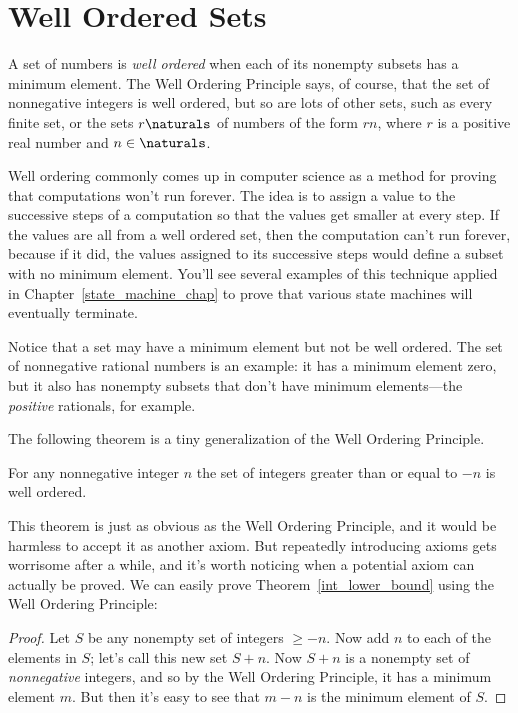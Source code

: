 \section{Well Ordered Sets}\label{well_ordering_sec}

A set of numbers is \emph{well ordered}%
when each of its nonempty subsets has a minimum element.  The Well
Ordering Principle says, of course, that the set of nonnegative
integers is well ordered, but so are lots of other sets, such as every
finite set, or the sets $r\naturals$ of numbers of the form $rn$,
where $r$ is a positive real number and $n \in \naturals$.

Well ordering commonly comes up in computer science as a method for
proving that computations won't run forever.  The idea is to assign a
value to the successive steps of a computation so that the values get
smaller at every step.  If the values are all from a well ordered set,
then the computation can't run forever, because if it did, the values
assigned to its successive steps would define a subset with no minimum
element.  You'll see several examples of this technique applied in
Chapter~\ref{state_machine_chap} to prove that various state machines%
will eventually terminate.

Notice that a set may have a minimum element but not be well ordered.
The set of nonnegative rational numbers is an example: it has a
minimum element zero, but it also has nonempty subsets that
don't have minimum elements---the \emph{positive} rationals, for
example.

The following theorem is a tiny generalization of the Well Ordering
Principle.

\begin{theorem}\label{int_lower_bound}
For any nonnegative integer $n$ the set of integers greater than or
equal to $-n$ is well ordered.
\end{theorem}

This theorem is just as obvious as the Well Ordering Principle, and it
would be harmless to accept it as another axiom.  But repeatedly
introducing axioms gets worrisome after a while, and it's worth
noticing when a potential axiom can actually be proved.  We can easily
prove Theorem~\ref{int_lower_bound} using the Well Ordering Principle:

\begin{proof}
Let $S$ be any nonempty set of integers $\geq -n$.  Now add $n$ to
each of the elements in $S$; let's call this new set $S+n$.  Now $S+n$
is a nonempty set of \emph{nonnegative} integers, and so by the Well
Ordering Principle, it has a minimum element $m$.  But then it's easy
to see that $m - n$ is the minimum element of $S$.
\end{proof}

